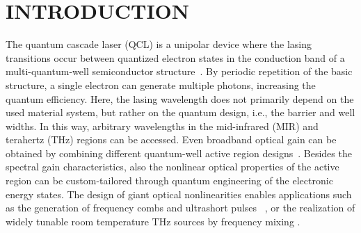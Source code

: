 \documentclass[a4paper]{spie}%
\begin{document}

\section{INTRODUCTION}

\label{sec:intro}

The quantum cascade laser (QCL) is a unipolar device where the lasing
transitions occur between quantized electron states in the conduction band of
a multi-quantum-well semiconductor structure~\cite{1994Sci...264..553F}. By
periodic repetition of the basic structure, a single electron can generate
multiple photons, increasing the quantum efficiency. Here, the lasing
wavelength does not primarily depend on the used material system, but rather
on the quantum design, i.e., the barrier and well widths. In this way,
arbitrary wavelengths in the mid-infrared (MIR) and terahertz (THz) regions
can be accessed. Even broadband optical gain can be obtained by combining
different quantum-well active region
designs~\cite{gmachl2002ultra,rosch2015octave}. Besides the spectral gain
characteristics, also the nonlinear optical properties of the active region
can be custom-tailored through quantum engineering of the electronic energy
states. The design of giant optical nonlinearities enables applications such
as the generation of frequency combs
\cite{2012Natur.492..229H,burghoff2014terahertz,wienold2014evidence,rosch2015octave}
and ultrashort pulses~\cite{wang2009mode,barbieri2011coherent,revin2016active}%
, or the realization of widely tunable room temperature THz sources by
frequency mixing
\cite{belkin2008room,lu2012widely,vijayraghavan2013broadly,lu2014continuous}.
\end{document}
